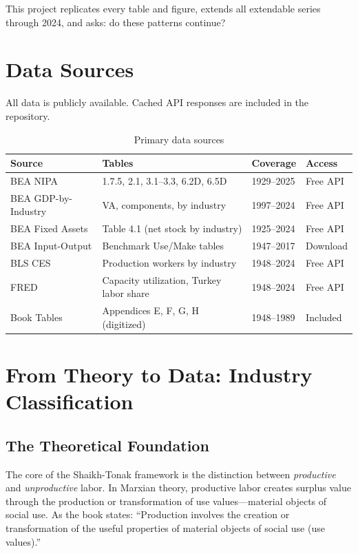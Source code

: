 \documentclass[12pt,a4paper]{article}
\begin{document}
This project replicates every table and figure, extends all extendable series through 2024, and asks: do these patterns continue?

\section{Data Sources}

All data is publicly available. Cached API responses are included in the repository.

\begin{table}[H]
\centering
\caption{Primary data sources}
\begin{tabular}{llll}
\toprule
Source & Tables & Coverage & Access \\
\midrule
BEA NIPA & 1.7.5, 2.1, 3.1--3.3, 6.2D, 6.5D & 1929--2025 & Free API \\
BEA GDP-by-Industry & VA, components, by industry & 1997--2024 & Free API \\
BEA Fixed Assets & Table 4.1 (net stock by industry) & 1925--2024 & Free API \\
BEA Input-Output & Benchmark Use/Make tables & 1947--2017 & Download \\
BLS CES & Production workers by industry & 1948--2024 & Free API \\
FRED & Capacity utilization, Turkey labor share & 1948--2024 & Free API \\
Book Tables & Appendices E, F, G, H (digitized) & 1948--1989 & Included \\
\bottomrule
\end{tabular}
\end{table}

\section{From Theory to Data: Industry Classification}

\subsection{The Theoretical Foundation}

The core of the Shaikh-Tonak framework is the distinction between \textit{productive} and \textit{unproductive} labor. In Marxian theory, productive labor creates surplus value through the production or transformation of use values---material objects of social use. As the book states: ``Production involves the creation or transformation of the useful properties of material objects of social use (use values).''
\end{document}
